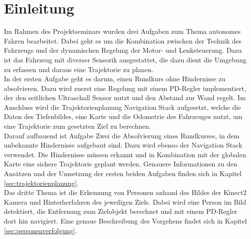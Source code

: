 \section{Einleitung}
\label{sec:einleitung}
Im Rahmen des Projektseminars wurden drei Aufgaben zum Thema autonomes Fahren bearbeitet. Dabei geht es um die Kombination zwischen der Technik des Fahrzeugs und der dynamischen Regelung der Motor- und Lenksteuerung. Dazu ist das Fahrzeug mit diverser Sensorik ausgestattet, die dazu dient die Umgebung zu erfassen und daraus eine Trajektorie zu planen. \\
In der ersten Aufgabe geht es darum, einen Rundkurs ohne Hindernisse zu absolvieren. Dazu wird zuerst eine Regelung mit einem PD-Regler implementiert, der den seitlichen Ultraschall Sensor nutzt und den Abstand zur Wand regelt. Im Anschluss wird die Trajektorienplanung Navigation Stack aufgesetzt, welche die Daten des Tiefenbildes, eine Karte und die Odometrie des Fahrzeuges nutzt, um eine Trajektorie zum gesetzten Ziel zu berechnen.\\
Darauf aufbauend ist Aufgabe Zwei die Absolvierung eines Rundkurses, in dem unbekannte Hindernisse aufgebaut sind. Dazu wird ebenso der Navigation Stack verwendet. Die Hindernisse m\"ussen erkannt und in Kombination mit der globalen Karte eine sichere Trajektorie geplant werden. Genauere Informationen zu den Ans\"atzen und der Umsetzung der ersten beiden Aufgaben finden sich in Kapitel \ref{sec:trajektorienplanung}.\\
Das dritte Thema ist die Erkennung von Personen anhand des Bildes der Kinect2 Kamera und Hinterherfahren des jeweiligen Ziels. Dabei wird eine Person im Bild detektiert, die Entfernung zum Zielobjekt berechnet und mit einem PD-Regler dort hin navigiert. Eine genaue Beschreibung des Vorgehens findet sich in Kapitel \ref{sec:personenverfolgung}.